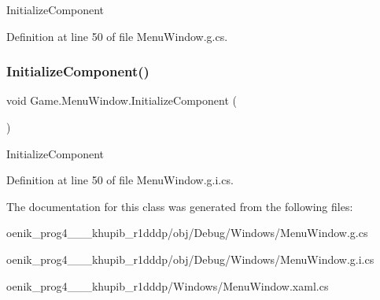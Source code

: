 Initialize\+Component 



Definition at line 50 of file Menu\+Window.\+g.\+cs.

\mbox{\label{class_game_1_1_menu_window_a22610c5f8a989abc6d3518b498acf3b4}} 
\subsubsection{\texorpdfstring{InitializeComponent()}{InitializeComponent()}\hspace{0.1cm}{\footnotesize\ttfamily [2/2]}}
{\footnotesize\ttfamily void Game.\+Menu\+Window.\+Initialize\+Component (\begin{DoxyParamCaption}{ }\end{DoxyParamCaption})}



Initialize\+Component 



Definition at line 50 of file Menu\+Window.\+g.\+i.\+cs.



The documentation for this class was generated from the following files\+:\begin{DoxyCompactItemize}
\item 
oenik\+\_\+prog4\+\_\+\_\+\_\+khupib\+\_\+r1dddp/obj/\+Debug/\+Windows/Menu\+Window.\+g.\+cs\item 
oenik\+\_\+prog4\+\_\+\_\+\_\+khupib\+\_\+r1dddp/obj/\+Debug/\+Windows/Menu\+Window.\+g.\+i.\+cs\item 
oenik\+\_\+prog4\+\_\+\_\+\_\+khupib\+\_\+r1dddp/\+Windows/Menu\+Window.\+xaml.\+cs\end{DoxyCompactItemize}
